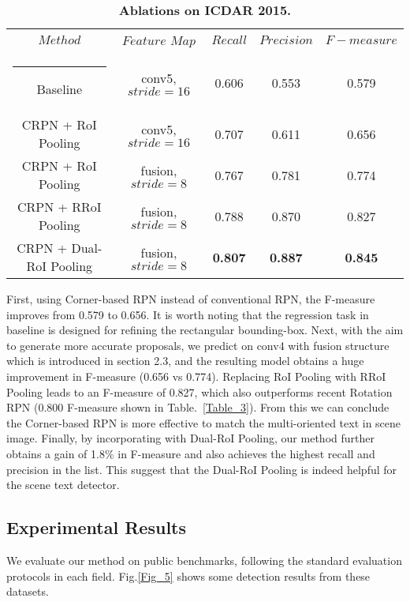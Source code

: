 \documentclass[3p, times]{elsarticle}
\makeatletter
\newcommand{\thickhline}{\noalign {\ifnum 0=`}\fi \hrule height 1pt
    \futurelet \reserved@a \@xhline
}
\newcommand{\topcaption}{\setlength{\abovecaptionskip}{0pt}\setlength{\belowcaptionskip}{8pt}\caption}
\makeatother
\begin{document}
\setlength{\tabcolsep}{8pt}
\begin{table}[!htb]
\centering
\topcaption{\textbf{Ablations on ICDAR 2015.}}
\label{Table_1}
\begin{tabular}{|c|c|c|c|c|}
    \hline
    $Method$                & $Feature$ $Map$     & $Recall$    & $Precision$ & $F-measure$ \\\thickhline
    Baseline                & conv5, $stride=16$  & 0.606       & 0.553       & 0.579       \\\hline
    CRPN + RoI Pooling      & conv5, $stride=16$  & 0.707       & 0.611       & 0.656       \\\hline
    CRPN + RoI Pooling      & fusion, $stride=8$  & 0.767       & 0.781       & 0.774       \\\hline
    CRPN + RRoI Pooling     & fusion, $stride=8$  & 0.788       & 0.870       & 0.827       \\\hline
    CRPN + Dual-RoI Pooling & fusion, $stride=8$  & {\bf 0.807} & {\bf 0.887} & {\bf 0.845} \\\hline
\end{tabular}
\end{table}
\setlength{\tabcolsep}{1.4pt}

First, using Corner-based RPN instead of conventional RPN, the F-measure improves from 0.579 to 0.656. It is worth noting that the regression task in baseline is designed for refining the rectangular bounding-box. Next, with the aim to generate more accurate proposals, we predict on conv4 with fusion structure which is introduced in section 2.3, and the resulting model obtains a huge improvement in F-measure (0.656 vs 0.774). Replacing RoI Pooling with RRoI Pooling leads to an F-measure of 0.827, which also outperforms recent Rotation RPN (0.800 F-measure shown in Table.~\ref{Table_3}). From this we can conclude the Corner-based RPN is more effective to match the multi-oriented text in scene image. Finally, by incorporating with Dual-RoI Pooling, our method further obtains a gain of 1.8\% in F-measure and also achieves the highest recall and precision in the list. This suggest that the Dual-RoI Pooling is indeed helpful for the scene text detector. 




\subsection{Experimental Results}
We evaluate our method on public benchmarks, following the standard evaluation protocols in each field. Fig.\ref{Fig_5} shows some detection results from these datasets. 
\end{document}
